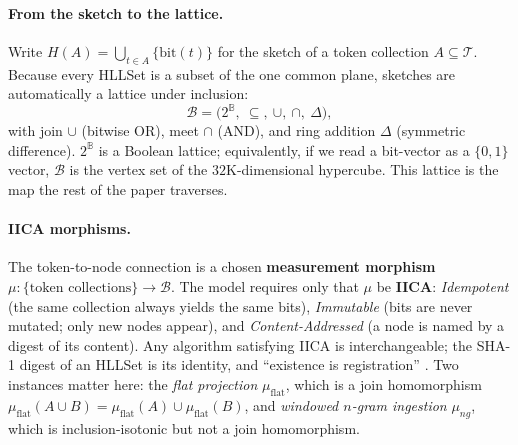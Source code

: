 \documentclass[11pt,a4paper]{article}
\theoremstyle{remark}
\newcommand{\Plane}{\ensuremath{\mathbb{B}}}          %
\newcommand{\Lat}{\ensuremath{\mathcal{B}}}            %
\newcommand{\Tok}{\ensuremath{\mathcal{T}}}            %
\newcommand{\HLL}{\ensuremath{H}}                      %
\newcommand{\xor}{\ensuremath{\Delta}}                 %
\begin{document}
\paragraph{From the sketch to the lattice.} Write
$\HLL(A)=\bigcup_{t\in A}\{\mathrm{bit}(t)\}$ for the sketch of a token
collection $A\subseteq\Tok$. Because every HLLSet is a subset of the one common
plane, sketches are automatically a lattice under inclusion:
\begin{equation}
\label{eq:lattice}
\Lat=\bigl(2^{\Plane},\ \subseteq,\ \cup,\ \cap,\ \xor\bigr),
\end{equation}
with join $\cup$ (bitwise OR), meet $\cap$ (AND), and ring addition $\xor$
(symmetric difference). $2^{\Plane}$ is a Boolean lattice; equivalently, if we
read a bit-vector as a $\{0,1\}$ vector, $\Lat$ is the vertex set of the
$32$K-dimensional hypercube. This lattice is the map the rest of the paper
traverses.

\paragraph{IICA morphisms.} The token-to-node connection is a chosen
\textbf{measurement morphism} $\mu:\{\text{token collections}\}\to\Lat$. The
model requires only that $\mu$ be \textbf{IICA}: \emph{Idempotent} (the same
collection always yields the same bits), \emph{Immutable} (bits are never
mutated; only new nodes appear), and \emph{Content-Addressed} (a node is named
by a digest of its content). Any algorithm satisfying IICA is interchangeable;
the SHA-1 digest of an HLLSet is its identity, and ``existence is registration''
\cite{companion2026}. Two instances matter here: the \emph{flat projection}
$\mu_{\mathrm{flat}}$, which is a join homomorphism
$\mu_{\mathrm{flat}}(A\cup B)=\mu_{\mathrm{flat}}(A)\cup\mu_{\mathrm{flat}}(B)$,
and \emph{windowed $n$-gram ingestion} $\mu_{ng}$, which is
inclusion-isotonic but not a join homomorphism.
\end{document}
